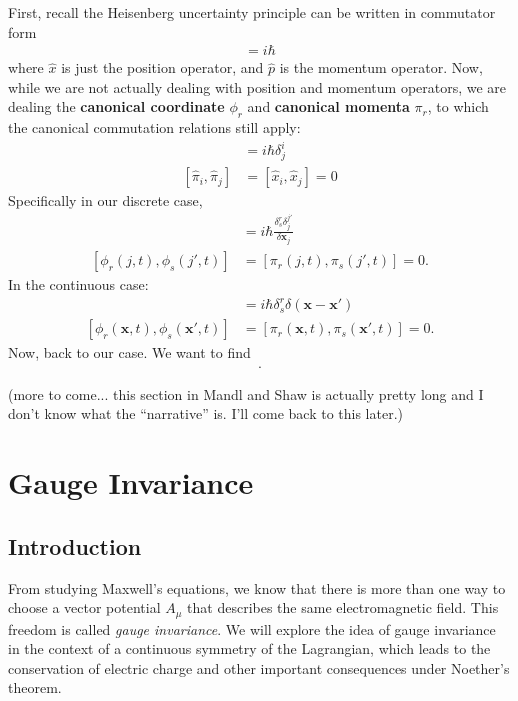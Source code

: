 \documentclass{book}
\numberwithin{equation}{section}
\theoremstyle{definition}
\begin{document}
First, recall the Heisenberg uncertainty principle can be written in commutator form
\begin{align}
[\hat{x},\hat{p}] = i\hbar
\end{align}
where $\hat{x}$ is just the position operator, and $\hat{p}$ is the momentum operator. Now, while we are not actually dealing with position and momentum operators, we are dealing the \textbf{canonical coordinate} $\phi_r$ and \textbf{canonical momenta} $\pi_r$, to which the canonical commutation relations still apply:
\begin{align}
[\hat{x}_i,\hat{\pi}_j] &= i\hbar \delta^i_j\\
[\hat{\pi}_i,\hat{\pi}_j] &= [\hat{x}_i,\hat{x}_j] = 0
\end{align}
Specifically in our discrete case, 
\begin{align}
[\phi_r(i,t), \pi_s(j',t)] &= i\hbar\frac{\delta^r_s \delta ^{j'}_j}{\delta \mathbf{x}_j}\\
[\phi_r(j,t),\phi_s(j',t)] &= [\pi_r(j,t), \pi_s(j',t)] = 0.
\end{align}
In the continuous case:
\begin{align}
[\phi_r(\mathbf{x},t), \pi_s(\mathbf{x}',t)] &= i\hbar\delta^r_s \delta(\mathbf{x} - \mathbf{x}')\\
[\phi_r(\mathbf{x},t),\phi_s(\mathbf{x'},t)] &= [\pi_r(\mathbf{x},t),\pi_s(\mathbf{x'},t)] = 0.
\end{align}
Now, back to our case. We want to find 
\begin{align}
[Q,\phi_r(x)].
\end{align}

(more to come... this section in Mandl and Shaw is actually pretty long and I don't know what the ``narrative'' is. I'll come back to this later.)

\newpage
\chapter{Gauge Invariance}
\section{Introduction}
From studying Maxwell's equations, we know that there is more than one way to choose a vector potential $A_\mu$ that describes the same electromagnetic field. This freedom is called \textit{gauge invariance}. We will explore the idea of gauge invariance  in the context of a continuous symmetry of the Lagrangian, which leads to the conservation of electric charge and other important consequences under Noether's theorem.\\
\end{document}
